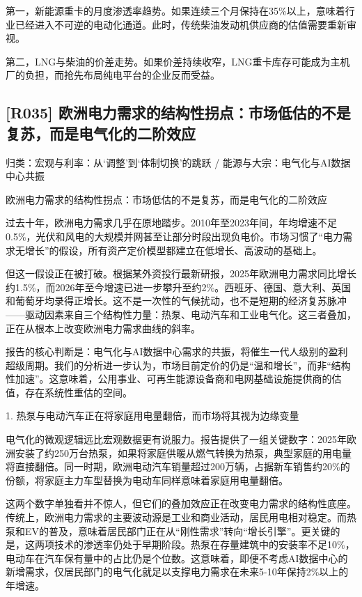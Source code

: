 \documentclass[11pt]{ctexart}
\begin{document}
第一，新能源重卡的月度渗透率趋势。如果连续三个月保持在35\%以上，意味着行业已经进入不可逆的电动化通道。此时，传统柴油发动机供应商的估值需要重新审视。

第二，LNG与柴油的价差走势。如果价差持续收窄，LNG重卡库存可能成为主机厂的负担，而抢先布局纯电平台的企业反而受益。

\subsection{[R035] 欧洲电力需求的结构性拐点：市场低估的不是复苏，而是电气化的二阶效应}
{\small\color{refgray}归类：宏观与利率：从‘调整’到‘体制切换’的跳跃 / 能源与大宗：电气化与AI数据中心共振}

欧洲电力需求的结构性拐点：市场低估的不是复苏，而是电气化的二阶效应

过去十年，欧洲电力需求几乎在原地踏步。2010年至2023年间，年均增速不足0.5\%，光伏和风电的大规模并网甚至让部分时段出现负电价。市场习惯了“电力需求无增长”的假设，所有资产定价模型都建立在低增长、高波动的基础上。

但这一假设正在被打破。根据某外资投行最新研报，2025年欧洲电力需求同比增长约1.5\%，而2026年至今增速已进一步攀升至约2\%。西班牙、德国、意大利、英国和葡萄牙均录得正增长。这不是一次性的气候扰动，也不是短期的经济复苏脉冲——驱动因素来自三个结构性力量：热泵、电动汽车和工业电气化。这三者叠加，正在从根本上改变欧洲电力需求曲线的斜率。

报告的核心判断是：电气化与AI数据中心需求的共振，将催生一代人级别的盈利超级周期。我们的分析进一步认为，市场目前定价的仍是“温和增长”，而非“结构性加速”。这意味着，公用事业、可再生能源设备商和电网基础设施提供商的估值，存在系统性重估的空间。

1. 热泵与电动汽车正在将家庭用电量翻倍，而市场将其视为边缘变量

电气化的微观逻辑远比宏观数据更有说服力。报告提供了一组关键数字：2025年欧洲安装了约250万台热泵，如果将家庭供暖从燃气转换为热泵，典型家庭的用电量将直接翻倍。同一时期，欧洲电动汽车销量超过200万辆，占据新车销售约20\%的份额，将家庭主力车型替换为电动车同样意味着家庭用电量翻倍。

这两个数字单独看并不惊人，但它们的叠加效应正在改变电力需求的结构性底座。传统上，欧洲电力需求的主要波动源是工业和商业活动，居民用电相对稳定。而热泵和EV的普及，意味着居民部门正在从“刚性需求”转向“增长引擎”。更关键的是，这两项技术的渗透率仍处于早期阶段。热泵在存量建筑中的安装率不足10\%，电动车在汽车保有量中的占比仍是个位数。这意味着，即便不考虑AI数据中心的新增需求，仅居民部门的电气化就足以支撑电力需求在未来5-10年保持2\%以上的年增速。
\end{document}
